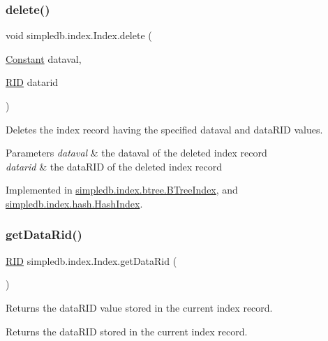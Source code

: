 \subsubsection{\texorpdfstring{delete()}{delete()}}
{\footnotesize\ttfamily void simpledb.\+index.\+Index.\+delete (\begin{DoxyParamCaption}\item[{\hyperlink{classsimpledb_1_1query_1_1Constant}{Constant}}]{dataval,  }\item[{\hyperlink{classsimpledb_1_1record_1_1RID}{R\+ID}}]{datarid }\end{DoxyParamCaption})}

Deletes the index record having the specified dataval and data\+R\+ID values. 
\begin{DoxyParams}{Parameters}
{\em dataval} & the dataval of the deleted index record \\
\hline
{\em datarid} & the data\+R\+ID of the deleted index record \\
\hline
\end{DoxyParams}


Implemented in \hyperlink{classsimpledb_1_1index_1_1btree_1_1BTreeIndex_ae7be53ba321674d7300c2c67376a9859}{simpledb.\+index.\+btree.\+B\+Tree\+Index}, and \hyperlink{classsimpledb_1_1index_1_1hash_1_1HashIndex_a76d2d6f98901db61549cfe51a1433d45}{simpledb.\+index.\+hash.\+Hash\+Index}.

\mbox{\label{interfacesimpledb_1_1index_1_1Index_aad4ee85740a0f5b3453bdf24e8b82615}} 
\subsubsection{\texorpdfstring{get\+Data\+Rid()}{getDataRid()}}
{\footnotesize\ttfamily \hyperlink{classsimpledb_1_1record_1_1RID}{R\+ID} simpledb.\+index.\+Index.\+get\+Data\+Rid (\begin{DoxyParamCaption}{ }\end{DoxyParamCaption})}

Returns the data\+R\+ID value stored in the current index record. \begin{DoxyReturn}{Returns}
the data\+R\+ID stored in the current index record. 
\end{DoxyReturn}


